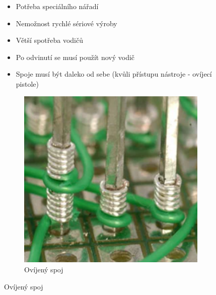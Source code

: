 \documentclass{article}
\begin{document}
\begin{figure}[H]
\begin{minipage}[t]{0.58\textwidth}
\begin{itemize}
\begin{itemize}
        \item Potřeba speciálního nářadí
        \item Nemožnost rychlé sériové výroby
        \item Větší spotřeba vodičů
        \item Po odvinutí se musí použít nový vodič
        \item Spoje musí být daleko od sebe (kvůli přístupu nástroje - ovíjecí pistole)
      \end{itemize}
    \end{itemize}    
  \end{minipage}
  \hfil
  \begin{minipage}[t]{0.4\textwidth}
    \begin{figure}[H]
      \centering
      \includegraphics[width=\textwidth]{ovijen1.png}
      \caption{Ovíjený spoj}
    \end{figure}


\end{minipage}
\end{figure}
\end{document}
